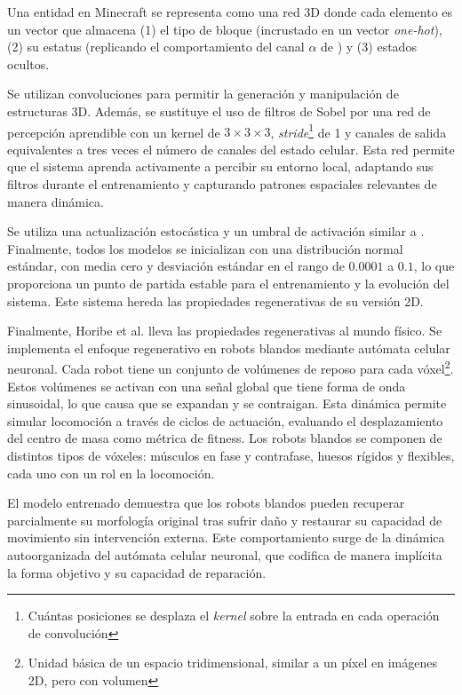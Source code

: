 Una entidad en Minecraft se representa como una red 3D donde cada elemento es un vector que almacena (1) el tipo de bloque (incrustado en un vector \textit{one-hot}), (2) su estatus (replicando el comportamiento del canal $\alpha$ de \cite{mordvintsevNCA}) y (3) estados ocultos.

Se utilizan convoluciones para permitir la generación y manipulación de estructuras 3D. Además, se sustituye el uso de filtros de Sobel por una red de percepción aprendible con un kernel de $3 \times 3 \times 3$, \textit{stride}\footnote{Cuántas posiciones se desplaza el \textit{kernel} sobre la entrada en cada operación de convolución} de 1 y canales de salida equivalentes a tres veces el número de canales del estado celular. Esta red permite que el sistema aprenda activamente a percibir su entorno local, adaptando sus filtros durante el entrenamiento y capturando patrones espaciales relevantes de manera dinámica.

Se utiliza una actualización estocástica y un umbral de activación similar a \cite{mordvintsevNCA}. Finalmente, todos los modelos se inicializan con una distribución normal estándar, con media cero y desviación estándar en el rango de $0.0001$ a $0.1$, lo que proporciona un punto de partida estable para el entrenamiento y la evolución del sistema. Este sistema hereda las propiedades regenerativas de su versión 2D.

Finalmente, Horibe et al. \cite{horibe} lleva las propiedades regenerativas al mundo físico. Se implementa el enfoque regenerativo en robots blandos mediante autómata celular neuronal. Cada robot tiene un conjunto de volúmenes de reposo para cada vóxel\footnote{Unidad básica de un espacio tridimensional, similar a un píxel en imágenes 2D, pero con volumen}. Estos volúmenes se activan con una señal global que tiene forma de onda sinusoidal, lo que causa que se expandan y se contraigan. Esta dinámica permite simular locomoción a través de ciclos de actuación, evaluando el desplazamiento del centro de masa como métrica de fitness. Los robots blandos se componen de distintos tipos de vóxeles: músculos en fase y contrafase, huesos rígidos y flexibles, cada uno con un rol en la locomoción.

El modelo entrenado demuestra que los robots blandos pueden recuperar parcialmente su morfología original tras sufrir daño y restaurar su capacidad de movimiento sin intervención externa. Este comportamiento surge de la dinámica autoorganizada del autómata celular neuronal, que codifica de manera implícita la forma objetivo y su capacidad de reparación.


